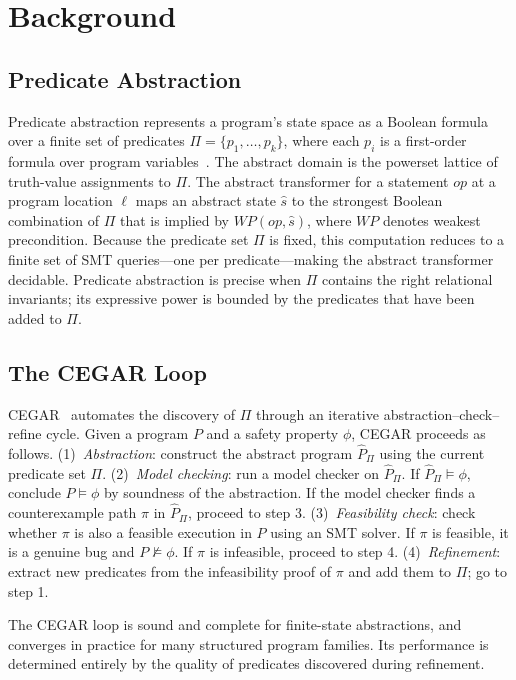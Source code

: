 \section{Background}
\label{sec:background}

\subsection{Predicate Abstraction}

Predicate abstraction represents a program's state space as a Boolean formula over a
finite set of predicates $\Pi = \{p_1, \ldots, p_k\}$, where each $p_i$ is a first-order
formula over program variables~\cite{predabstraction1997}. The abstract domain is the
powerset lattice of truth-value assignments to $\Pi$. The abstract transformer for a
statement $\textit{op}$ at a program location $\ell$ maps an abstract state
$\hat{s}$ to the strongest Boolean combination of $\Pi$ that is implied by
$\textit{WP}(\textit{op}, \hat{s})$, where $\textit{WP}$ denotes weakest precondition.
Because the predicate set $\Pi$ is fixed, this computation reduces to a finite set of
SMT queries---one per predicate---making the abstract transformer decidable. Predicate
abstraction is precise when $\Pi$ contains the right relational invariants; its
expressive power is bounded by the predicates that have been added to $\Pi$.

\subsection{The CEGAR Loop}

CEGAR~\cite{cegar2003} automates the discovery of $\Pi$ through an iterative
abstraction--check--refine cycle. Given a program $P$ and a safety property $\phi$,
CEGAR proceeds as follows. (1)~\emph{Abstraction}: construct the abstract program
$\hat{P}_\Pi$ using the current predicate set $\Pi$. (2)~\emph{Model checking}: run
a model checker on $\hat{P}_\Pi$. If $\hat{P}_\Pi \models \phi$, conclude $P \models
\phi$ by soundness of the abstraction. If the model checker finds a counterexample
path $\pi$ in $\hat{P}_\Pi$, proceed to step 3. (3)~\emph{Feasibility check}: check
whether $\pi$ is also a feasible execution in $P$ using an SMT solver. If $\pi$ is
feasible, it is a genuine bug and $P \not\models \phi$. If $\pi$ is infeasible,
proceed to step 4. (4)~\emph{Refinement}: extract new predicates from the
infeasibility proof of $\pi$ and add them to $\Pi$; go to step 1.

The CEGAR loop is sound and complete for finite-state abstractions, and converges in
practice for many structured program families. Its performance is determined entirely
by the quality of predicates discovered during refinement.

